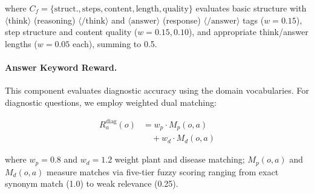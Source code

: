 \documentclass[sigconf,anonymous,review]{acmart}
\begin{document}
\noindent where $C_f = \{\text{struct.}, \text{steps}, \text{content}, \text{length}, \text{quality}\}$ evaluates basic structure with $\langle\text{think}\rangle$ (reasoning) $\langle/\text{think}\rangle$ and $\langle\text{answer}\rangle$ (response) $\langle/\text{answer}\rangle$ tags ($w=0.15$), step structure and content quality ($w=0.15, 0.10$), and appropriate think/answer lengths ($w=0.05$ each), summing to 0.5.

\paragraph{Answer Keyword Reward.}
This component evaluates diagnostic accuracy using the domain vocabularies. For diagnostic questions, we employ weighted dual matching:

\begin{equation}
\begin{aligned}
R_a^{\text{diag}}(o) &= w_p \cdot M_p(o, a) \\
&\quad + w_d \cdot M_d(o, a)
\end{aligned}
\label{eq:answer_diag}
\end{equation}

\noindent where $w_p=0.8$ and $w_d=1.2$ weight plant and disease matching; $M_p(o, a)$ and $M_d(o, a)$ measure matches via five-tier fuzzy scoring ranging from exact synonym match (1.0) to weak relevance (0.25).

\end{document}
